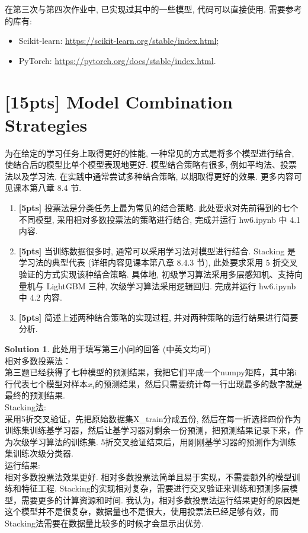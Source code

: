 \documentclass[a4paper,UTF8]{article}
\numberwithin{equation}{section}
\numberwithin{equation}{section}
\theoremstyle{definition}
\newtheorem*{solution}{Solution}
\begin{document}
在第三次与第四次作业中, 已实现过其中的一些模型, 代码可以直接使用. 需要参考的库有:

\begin{itemize}
    \item Scikit-learn: \href{https://scikit-learn.org/stable/index.html}{https://scikit-learn.org/stable/index.html};
    \item PyTorch: \href{https://pytorch.org/docs/stable/index.html}{https://pytorch.org/docs/stable/index.html}.
\end{itemize}

\newpage

\section{[15pts] Model Combination Strategies}

为在给定的学习任务上取得更好的性能, 一种常见的方式是将多个模型进行结合, 使结合后的模型比单个模型表现地更好. 
模型结合策略有很多, 例如平均法、投票法以及学习法.
在实践中通常尝试多种结合策略, 以期取得更好的效果.
更多内容可见课本第八章 8.4 节.

\begin{enumerate}
    \item[(1)] \textbf{[5pts]} 投票法是分类任务上最为常见的结合策略. 此处要求对先前得到的七个不同模型, 采用相对多数投票法的策略进行结合, 完成并运行 hw6.ipynb 中 4.1 内容.
    \item[(2)] \textbf{[5pts]} 当训练数据很多时, 通常可以采用学习法对模型进行结合. Stacking 是学习法的典型代表 (详细内容见课本第八章 8.4.3 节), 此处要求采用 5 折交叉验证的方式实现该种结合策略. 具体地, 初级学习算法采用多层感知机、支持向量机与 LightGBM 三种, 次级学习算法采用逻辑回归. 完成并运行 hw6.ipynb 中 4.2 内容.
    \item[(3)] \textbf{[5pts]} 简述上述两种结合策略的实现过程, 并对两种策略的运行结果进行简要分析. 
\end{enumerate}

\begin{solution}
	此处用于填写第三小问的回答 (中英文均可) \\
    相对多数投票法：\\
    第三题已经获得了七种模型的预测结果，我把它们平成一个numpy矩阵，其中第i行代表七个模型对样本$x_i$的预测结果，然后只需要统计每一行出现最多的数字就是最终的预测结果. \\
    Stacking法: \\
    采用5折交叉验证，先把原始数据集X\_train分成五份, 然后在每一折选择四份作为训练集训练基学习器，然后让基学习器对剩余一份预测，把预测结果记录下来，作为次级学习算法的训练集. 5折交叉验证结束后，用刚刚基学习器的预测作为训练集训练次级分类器. \\
    运行结果: \\
    相对多数投票法效果更好. 相对多数投票法简单且易于实现，不需要额外的模型训练和特征工程. Stacking的实现相对复杂，需要进行交叉验证来训练和预测多层模型，需要更多的计算资源和时间. 我认为，相对多数投票法运行结果更好的原因是这个模型并不是很复杂，数据量也不是很大，使用投票法已经足够有效，而Stacking法需要在数据量比较多的时候才会显示出优势.
\end{solution}
\end{document}
